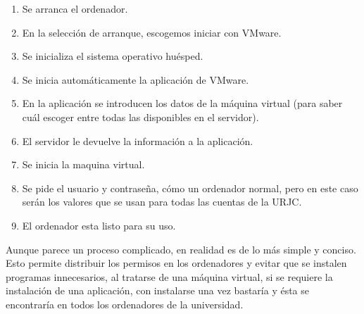 \begin{enumerate}
\item Se arranca el ordenador.
\item En la selección de arranque, escogemos iniciar con VMware.
\item Se inicializa el sistema operativo huésped.
\item Se inicia automáticamente la aplicación de VMware.
\item En la aplicación se introducen los datos de la máquina virtual (para saber cuál escoger entre todas las disponibles en el servidor).
\item El servidor le devuelve la información a la aplicación.
\item Se inicia la maquina virtual.
\item Se pide el usuario y contraseña, cómo un ordenador normal, pero en este caso serán los valores que se usan para todas las cuentas de la URJC.
\item El ordenador esta listo para su uso.
\end{enumerate}

Aunque parece un proceso complicado, en realidad es de lo más simple y conciso. Esto permite distribuir los permisos en los ordenadores y evitar que se instalen programas innecesarios, al tratarse de una máquina virtual, si se requiere la instalación de una aplicación, con instalarse una vez bastaría y ésta se encontraría en todos los ordenadores de la universidad.
